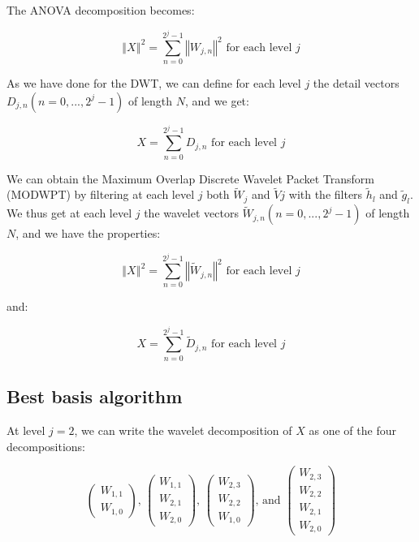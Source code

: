 \documentclass[methods.tex]{subfiles}
\begin{document}
The ANOVA decomposition becomes:

\begin{equation}
\left\Vert X \right\Vert ^2 = \sum_{n = 0}^{2^j - 1} \left\Vert W_{j,n} \right\Vert ^2 \text{ for each level } j
\end{equation}

As we have done for the DWT, we can define for each level $j$ the detail vectors $D_{j,n} \left( n = 0 , ... , 2^j - 1 \right)$ of length $N$, and we get:

\begin{equation}
X = \sum_{n = 0}^{2^j - 1} D_{j,n} \text{ for each level } j
\end{equation}

We can obtain the Maximum Overlap Discrete Wavelet Packet Transform (MODWPT) by filtering at each level $j$ both $\widetilde{W}_j$ and $\widetilde{V}j$ with the filters $\widetilde{h}_l$ and $\widetilde{g}_l$. We thus get at each level $j$ the wavelet vectors $\widetilde{W}_{j,n} \left(n = 0 , ... , 2^j - 1 \right)$ of length $N$, and we have the properties:

\begin{equation}
\left\Vert X \right\Vert ^2 = \sum_{n = 0}^{2^j - 1} \left\Vert \widetilde{W}_{j,n} \right\Vert ^2 \text{ for each level } j
\end{equation}

and:

\begin{equation}
X = \sum_{n = 0}^{2^j - 1} \widetilde{D}_{j,n} \text{ for each level } j
\end{equation}

\subsection{Best basis algorithm}

At level $j = 2$, we can write the wavelet decomposition of $X$ as one of the four decompositions:

\begin{equation}
\begin{pmatrix}
W_{1,1} \\
W_{1,0}
\end{pmatrix} \text{, } \begin{pmatrix}
W_{1,1} \\
W_{2,1} \\
W_{2,0}
\end{pmatrix} \text{, } \begin{pmatrix}
W_{2,3} \\
W_{2,2} \\
W_{1,0}
\end{pmatrix} \text{, and } \begin{pmatrix}
W_{2,3} \\
W_{2,2} \\
W_{2,1} \\
W_{2,0}
\end{pmatrix}
\end{equation}
\end{document}
